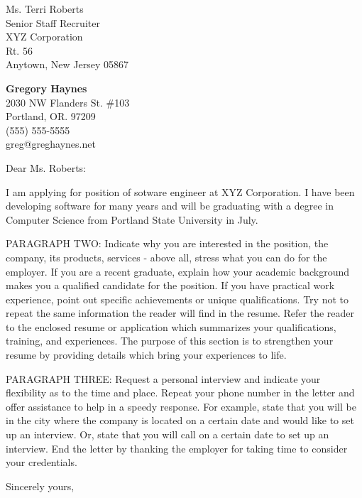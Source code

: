\documentclass{letter}
\begin{document}
\signature{Gregory A. Haynes}                  %
\longindentation=0pt                     %
\let\raggedleft\raggedright              %
 
\begin{letter}{Ms. Terri Roberts \\
Senior Staff Recruiter \\
XYZ Corporation \\
Rt. 56 \\
Anytown, New Jersey 05867} 

\begin{center}
{\large\bf Gregory Haynes} \\
{2030 NW Flanders St. \#103 \\ Portland, OR. 97209 \\ (555) 555-5555 \\ greg@greghaynes.net } 
\end{center} \vfill %
 

\opening{Dear Ms. Roberts:} 
 
\noindent I am applying for position of sotware engineer at XYZ Corporation.  I have been developing software for many years and will be graduating with a degree in Computer Science from Portland State University in July.

\noindent PARAGRAPH  TWO:  Indicate why you are interested in the position, 
the company, its products, services - above all, stress what  you 
can  do  for  the employer. If you are a recent graduate, explain 
how your academic background makes you a qualified candidate  for 
the  position.  If  you have practical work experience, point out 
specific achievements or unique qualifications. Try not to repeat 
the  same  information  the reader will find in the resume. Refer 
the reader to the enclosed resume or application which summarizes 
your  qualifications,  training,  and experiences. The purpose of 
this section is to strengthen your resume  by  providing  details 
which bring your experiences to life. 
 
\noindent PARAGRAPH THREE: Request a personal interview and  indicate  your 
flexibility as to the time and place. Repeat your phone number in 
the letter and offer assistance to help in a speedy response. For 
example,  state that you will be in the city where the company is 
located on a certain date and would like to set up an  interview. 
Or,  state  that  you  will  call  on a certain date to set up an 
interview. End the letter by thanking  the  employer  for  taking 
time to consider your credentials. 
 
\closing{Sincerely yours,}
 
  
\encl{}					%

\end{letter}
 
\end{document}
